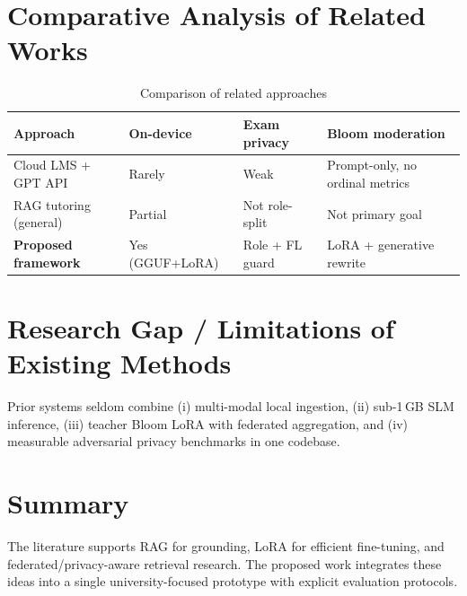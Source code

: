 \section{Comparative Analysis of Related Works}
\begin{table}[H]
\centering
\caption{Comparison of related approaches}
\label{tab:related_compare}
\renewcommand{\arraystretch}{1.2}
\begin{tabular}{|p{3.2cm}|p{2.2cm}|p{2.2cm}|p{4.5cm}|}
\hline
\rowcolor{gray!30}
\textbf{Approach} & \textbf{On-device} & \textbf{Exam privacy} & \textbf{Bloom moderation} \\
\hline
Cloud LMS + GPT API & Rarely & Weak & Prompt-only, no ordinal metrics \\
\hline
RAG tutoring (general) & Partial & Not role-split & Not primary goal \\
\hline
\textbf{Proposed framework} & Yes (GGUF+LoRA) & Role + FL guard & LoRA + generative rewrite \\
\hline
\end{tabular}
\end{table}

\section{Research Gap / Limitations of Existing Methods}
Prior systems seldom combine (i) multi-modal local ingestion, (ii) sub-1\,GB SLM inference, (iii) teacher Bloom LoRA with federated aggregation, and (iv) measurable adversarial privacy benchmarks in one codebase.

\section{Summary}
The literature supports RAG for grounding, LoRA for efficient fine-tuning, and federated/privacy-aware retrieval research. The proposed work integrates these ideas into a single university-focused prototype with explicit evaluation protocols.
